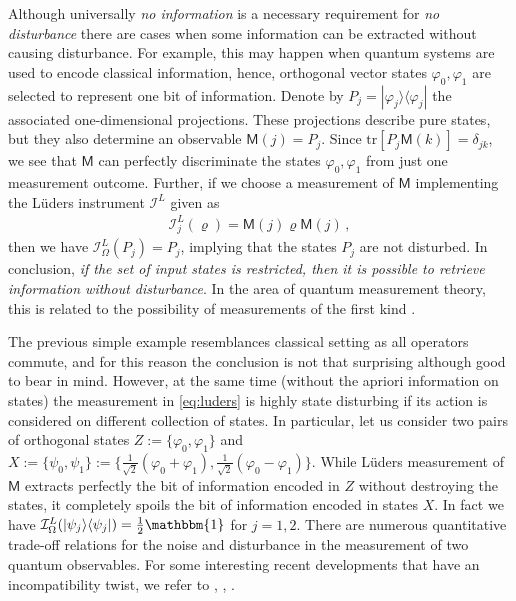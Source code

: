 \documentclass[12pt]{iopart}
\theoremstyle{definition}
\newcommand{\kb}[2]{|#1\rangle\langle#2|} %
\renewcommand{\tr}[1]{\textrm{tr}\left[#1\right]} %
\newcommand{\id}{\mathbbm{1}} %
\newcommand{\Mo}{\mathsf{M}}%
\newcommand{\Ii}{\mathcal{I}}
\begin{document}
{Although universally \emph{no information} is a necessary requirement 
for \emph{no disturbance} there are cases when some information can be extracted
without causing disturbance. For example, this may happen when quantum 
systems are used to encode classical information, hence, orthogonal vector 
states $\varphi_0, \varphi_1$ are selected to represent one bit of information.  
Denote by $P_j = \kb{\varphi_j}{\varphi_j}$ the associated one-dimensional projections. These projections describe pure states, but they also determine an observable $\Mo(j)=P_j$. Since $\tr{P_j\Mo(k)}=\delta_{jk}$, we see that  $\Mo$ can perfectly discriminate the states $\varphi_0,\varphi_1$ from just one measurement outcome. Further, if we choose a measurement of $\Mo$ implementing the L\"uders instrument $\Ii^L$ given as
\begin{align}\label{eq:luders}
\Ii^L_j(\varrho) = \Mo(j)\varrho \Mo(j) \, , 
\end{align}
then we have $\Ii^L_\Omega(P_j) = P_j$, implying that the 
states $P_j$ are not disturbed. In conclusion, \emph{if the set of input 
states is restricted, then it is possible to retrieve information 
without disturbance}. 
In the area of quantum measurement theory, this is related to the possibility of measurements of the first kind \cite{BuCaLa90}.

The previous simple example resemblances classical setting as all operators commute, and for this reason the conclusion is not that surprising although good to bear in mind. However, at the same time (without the apriori information on states) the measurement in \eqref{eq:luders} is highly state disturbing if its action is considered on different collection of states. In particular, let us consider two pairs of orthogonal states $Z:= \{ \varphi_0, \varphi_1\}$ and 
$X:= \{ \psi_0, \psi_1\}:= \{\frac{1}{\sqrt{2}}(\varphi_0 + \varphi_1), 
\frac{1}{\sqrt{2}}(\varphi_0 - \varphi_1)\}$. 
While L\"uders measurement of $\Mo$ extracts perfectly   
the bit of information encoded in $Z$ without destroying the states, 
it completely spoils the bit of information encoded in states 
$X$. 
In fact we have  $\Ii^L_{\Omega} ( |\psi_j \rangle \langle \psi_j|) 
= \frac{1}{2}\id$ for $j=1,2$.
There are numerous quantitative trade-off relations for the noise and disturbance in the measurement of two quantum observables. 
For some interesting recent developments that have an incompatibility twist, we refer to \cite{BuHaOzWi14}, \cite{MaSr14a}, \cite{ReSc14}. 

}
\end{document}
